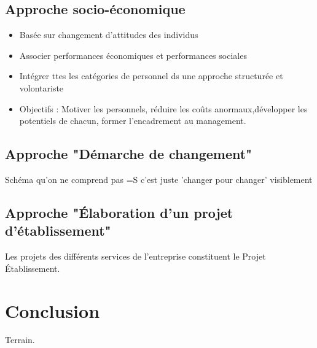		\subsection{Approche socio-économique}
		\begin{itemize}
		\item Basée sur changement d'attitudes des individus
		\item Associer performances économiques et performances sociales
		\item Intégrer ttes les catégories de personnel ds une approche structurée et volontariste 
		\item Objectifs : Motiver les personnels, réduire les coûts anormaux,développer les potentiels de chacun, former l'encadrement au management. 
		\end{itemize}
		\subsection{Approche "Démarche de changement"}
			Schéma qu'on ne comprend pas =S c'est juste 'changer pour changer' visiblement
		\subsection{Approche "Élaboration d'un projet d'établissement"}
			Les projets des différents services de l'entreprise constituent le Projet Établissement. 
	
	\section{Conclusion}
		Terrain. 